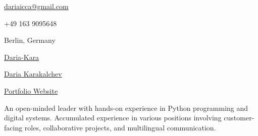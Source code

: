 \documentclass[11pt]{spidercv}
\begin{document}
  \begin{TopBar}{\ColorTextSide}

        \begin{DoubleColumns}
            \begin{ItemList}{\ColorHighlight}
                \item [\Large\faEnvelope] \href{mailto:dariaicca@gmail.com}{dariaicca@gmail.com}
                \item [\Large\faMobile] +49 163 9095648
                \item [\Large\faMapMarker] Berlin, Germany
            \end{ItemList}
            \nextcolumn
            \begin{ItemList}{\ColorHighlight}
                \item [\Large\faGithub] \href{https://github.com/Daria-Kara}{Daria-Kara}
                \item [\Large\faLinkedinSquare] \href{https://www.linkedin.com/in/daria-karakalchev-029147395/}{Daria Karakalchev}
                \item [\Large\faBook] 
                \href{https://daria-kara.github.io/Daria-Karakalchev.github.io/}{Portfolio Website}
            \end{ItemList}
        \end{DoubleColumns}

            {\raggedright
            An open-minded leader with hands-on experience in Python programming and digital systems. Accumulated experience in various positions involving customer-facing roles, collaborative projects, and multilingual communication.
            }
    \end{TopBar}
\end{document}
